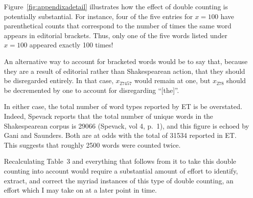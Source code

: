 Figure~\ref{fig:appendixadetail} illustrates how the effect of double counting is potentially substantial. For instance, four of the five entries for $x=100$ have parenthetical counts that correspond to the number of times the same word appears in editorial brackets.  Thus, only one of the five words listed under $x=100$ appeared exactly 100 times!

An alternative way to account for bracketed words would be to say that, because they are a result of editorial rather than Shakespearean action, that they should be disregarded entirely.  In that case, $x_{27457}$ would remain at one, but $x_{278}$ should be decremented by one to account for disregarding ``[the]''.

In either case, the total number of word types reported by ET is be overstated.  Indeed, Spevack reports that the total number of unique words in the Shakespearean corpus is 29066 (Spevack, vol 4, p.~1), and this figure is echoed by Gani and Saunders. Both are at odds with the total of 31534 reported in ET.  This suggests that roughly 2500 words were counted twice.

Recalculating Table~3 and everything that follows from it to take this double counting into account would require a substantial amount of effort to identify, extract, and correct the myriad instances of this type of double counting, an effort which I may take on at a later point in time.


